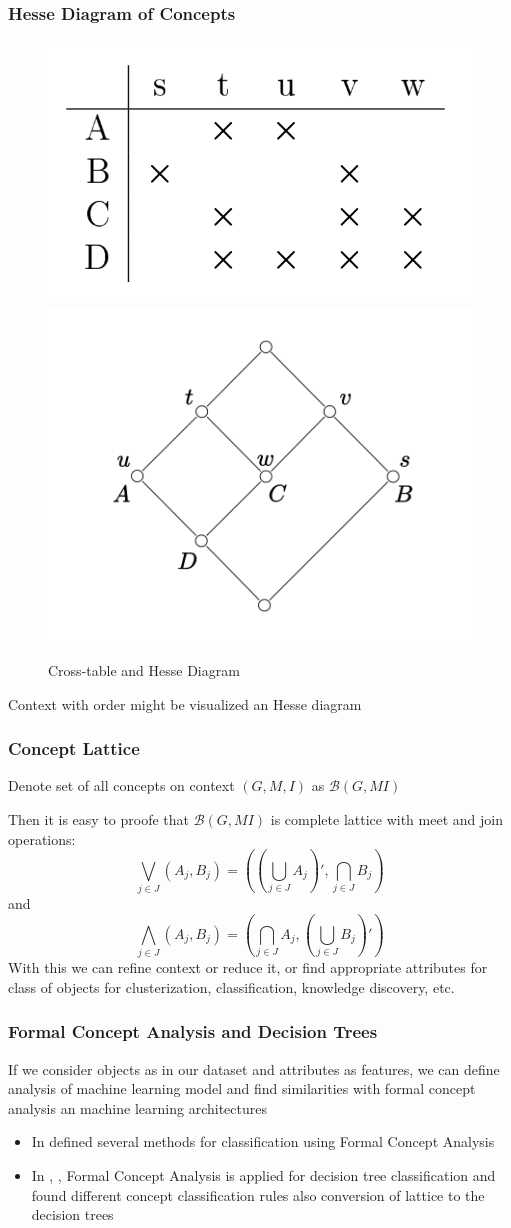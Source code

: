 \documentclass{beamer}
\newcommand {\B}                          {\mathcal{B}}
\begin{document}
\begin{frame}
    \frametitle{Hesse Diagram of Concepts}
    \begin{figure}
        \centering
        \includegraphics[width=0.4\linewidth]{cross_table_2.png} 
        \includegraphics[width=0.4\linewidth]{hesse_diagram_1.png}
        \caption{Cross-table and Hesse Diagram}
        \label{fig:cross_table_hesse_diag}
    \end{figure}
        
    Context with order might be visualized an Hesse diagram
\end{frame}

\begin{frame}
    \frametitle{Concept Lattice}
    Denote set of all concepts on context $(G, M, I)$ as $\B(G, M I)$

    Then it is easy to proofe that $\B(G, M I)$ is complete lattice with meet and join
    operations:
    $$
    \bigvee_{j \in J}{(A_j, B_j)} = ((\bigcup_{j \in J}{A_j})', \bigcap_{j \in J}{B_j})
    $$
    and
    $$
    \bigwedge_{j \in J}{(A_j, B_j)} = (\bigcap_{j \in J}{A_j}, (\bigcup_{j \in J}{B_j})')
    $$
    With this we can refine context or reduce it, 
    or find appropriate attributes for class of objects for clusterization, classification, 
    knowledge discovery, etc.
\end{frame}

\begin{frame}
    \frametitle{Formal Concept Analysis and Decision Trees}
    If we consider objects as in our dataset and attributes as features, we can define
    analysis of machine learning model and find similarities with formal concept analysis
    an machine learning architectures
    \begin{itemize}
        \item In \cite{ClassFCA} defined several methods for classification using 
        Formal Concept Analysis
        \item In \cite{DesTreeLatt}, \cite{DesRFCL}, \cite{LattClassTree} Formal Concept Analysis
        is applied for decision tree classification and found different concept classification rules
        also conversion of lattice to the decision trees
    \end{itemize}
\end{frame}
\end{document}
